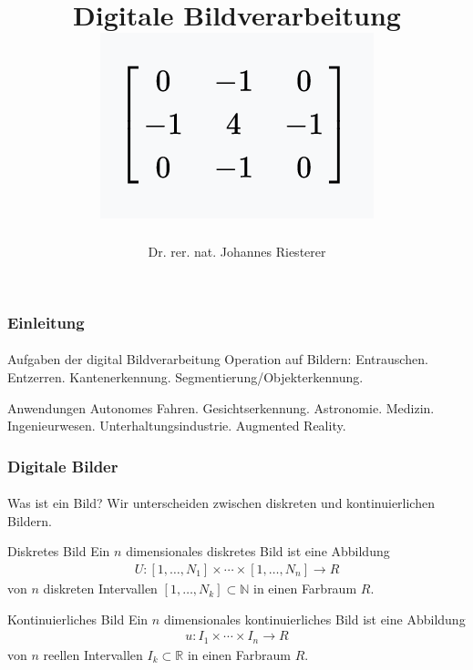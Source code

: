 \documentclass{beamer}
\begin{document}
\title[Digitale Bildverarbeitung] %
{Digitale Bildverarbeitung
\\
\includegraphics[scale=1.0]{img/cover}
}
\subtitle{}
\author[Dr. Johannes Riesterer] %
{Dr.  rer. nat. Johannes Riesterer}

\date[KPT 2004] %
{}

\subject{Digitale Bildverarbeitung}

\frame{\titlepage}

\begin{frame}
    \frametitle{Einleitung}
\framesubtitle{}
    \begin{block}{Aufgaben der digital Bildverarbeitung}
Operation auf Bildern:
Entrauschen. Entzerren. Kantenerkennung. Segmentierung/Objekterkennung.
\end{block}
    \begin{block}{Anwendungen}
Autonomes Fahren. Gesichtserkennung. Astronomie. Medizin. Ingenieurwesen. Unterhaltungsindustrie. Augmented Reality.
\end{block}
 \end{frame}

\begin{frame}
    \frametitle{Digitale Bilder}
\framesubtitle{}
    \begin{block}{Was ist ein Bild?}
Wir unterscheiden zwischen diskreten und kontinuierlichen Bildern. 
\end{block}

   \begin{block}{Diskretes Bild}
Ein $n$ dimensionales diskretes Bild ist eine Abbildung 
\begin{align*}
U : [1, \ldots, N_1] \times   \cdots \times [1, \ldots, N_n]   \to R
\end{align*}
von $n$ diskreten Intervallen  $[1, \ldots, N_k]  \subset \mathbb{N}$  in einen Farbraum $R$.
\end{block}

   \begin{block}{Kontinuierliches Bild}
Ein $n$ dimensionales kontinuierliches Bild ist eine Abbildung 
\begin{align*}
u : I_1 \times   \cdots \times I_n   \to R
\end{align*}
von $n$ reellen Intervallen $I_k \subset \mathbb{R}$ in einen Farbraum $R$.
\end{block}

 \end{frame}
\end{document}
